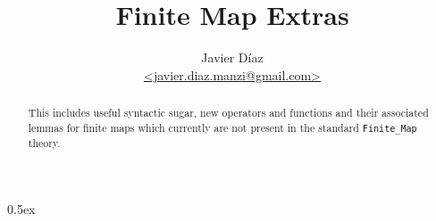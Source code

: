 \documentclass[11pt,a4paper]{article}
\begin{document}
\title{Finite Map Extras}
\author{Javier D\'iaz\\\url{<javier.diaz.manzi@gmail.com>}}
\maketitle

\begin{abstract}
  This includes useful syntactic sugar, new operators and functions and their associated lemmas for 
  finite maps which currently are not present in the standard \texttt{Finite\_Map} theory.
\end{abstract}

\tableofcontents

\parindent 0pt\parskip 0.5ex


\end{document}
